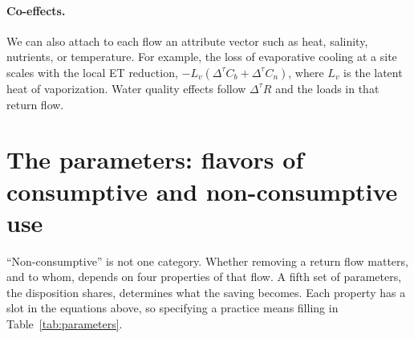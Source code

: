 \documentclass[11pt]{article}
\newcommand{\Cb}{C_b}                       %
\newcommand{\Cn}{C_n}                       %
\newcommand{\dtau}{\Delta^{\tau}}            %
\begin{document}
\paragraph{Co-effects.} We can also attach to each flow an attribute vector such as heat, salinity, nutrients, or temperature. For example, the loss of evaporative cooling at a site scales with the local ET reduction, $-L_v (\dtau \Cb + \dtau \Cn)$, where $L_v$ is the latent heat of vaporization. Water quality effects follow $\dtau R$ and the loads in that return flow.

\section{The parameters: flavors of consumptive and non-consumptive use}\label{sec:parameters}

``Non-consumptive'' is not one category. Whether removing a return flow matters, and to whom, depends on four properties of that flow. A fifth set of parameters, the disposition shares, determines what the saving becomes. Each property has a slot in the equations above, so specifying a practice means filling in Table~\ref{tab:parameters}.
\end{document}
